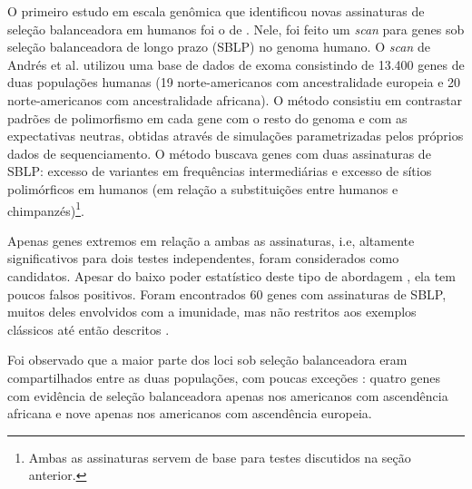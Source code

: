 \begin{refsection}
\begin{figure}[ht]
\label{fig:AllScans}
\end{figure}


O primeiro estudo em escala genômica que identificou novas assinaturas de seleção balanceadora em humanos foi o de \textcite{Andres2009}. Nele, foi feito um \emph{scan} para genes sob seleção balanceadora de longo prazo (SBLP) no genoma humano. O \emph{scan} de Andrés et al. utilizou uma base de dados de exoma consistindo de 13.400 genes de duas populações humanas (19 norte-americanos com ancestralidade europeia e 20 norte-americanos com ancestralidade africana). O método consistiu em contrastar padrões de polimorfismo em cada gene com o resto do genoma e com as expectativas neutras, obtidas através de simulações parametrizadas pelos próprios dados de sequenciamento. O método buscava genes com duas assinaturas de SBLP: excesso de variantes em frequências intermediárias e excesso de sítios polimórficos em humanos (em relação a substituições entre humanos e chimpanzés)\footnote{Ambas as assinaturas servem de base para testes discutidos na seção anterior.}.

Apenas genes extremos em relação a ambas as assinaturas, i.e, altamente significativos para dois testes independentes, foram considerados como candidatos. Apesar do baixo poder estatístico deste tipo de abordagem \parencite{Fijarczyk2015}, ela tem poucos falsos positivos. Foram encontrados 60 genes com assinaturas de SBLP, muitos deles envolvidos com a imunidade, mas não restritos aos exemplos clássicos até então descritos \parencite{Key2014b}.

Foi observado que a maior parte dos loci sob seleção balanceadora eram compartilhados entre as duas populações, com poucas exceções : quatro genes com evidência de seleção balanceadora apenas nos americanos com ascendência africana e nove apenas nos americanos com ascendência europeia.


\end{refsection}
